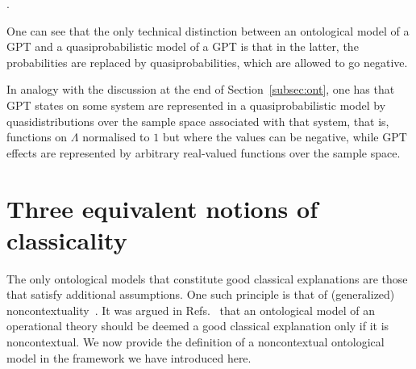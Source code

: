 \documentclass[onecolum,aps,groupedaddress,nofootinbib]{revtex4-2}
\newcommand{\john}[1]{{\color{red} #1}}
\begin{document}
\begin{definition}
\begin{enumerate}
.
\eeq
\end{enumerate}
\end{definition}

One can see that the only technical distinction between an ontological model of a GPT and a quasiprobabilistic model of a GPT is that in the latter, the probabilities are replaced by quasiprobabilities, which are allowed to go negative.

In analogy with the discussion at the end of Section~\ref{subsec:ont}, one has that GPT states on some system are represented in a quasiprobabilistic model by quasidistributions over the sample space associated with that system, that is, functions on $\Lambda$ normalised to $1$ but where the values can be negative, while GPT effects are represented by arbitrary real-valued functions over the sample space.

\section{Three equivalent notions of classicality} \label{threenotions}

The only ontological models that constitute good classical explanations are those that satisfy additional assumptions.
One such principle is that of (generalized) noncontextuality~\cite{Spekkens2005}. It was argued in Refs.~\cite{Spekkens2005,Pirsa_nc,Spekkens2008,schmid2019characterization}
that an ontological model of an operational theory should be deemed a good classical explanation only if it is noncontextual.
We now provide the definition of a noncontextual ontological model in the framework we have introduced here.
\end{document}
